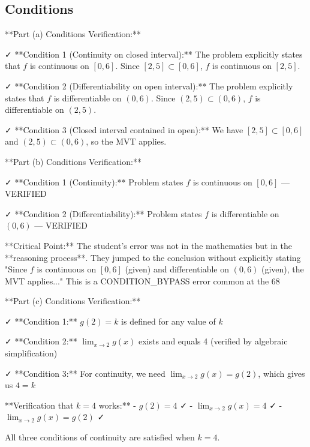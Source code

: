 \documentclass[11pt,letterpaper]{article}
\begin{document}
\subsection*{\textcolor{alphacyan}{Conditions}}
\begin{tcolorbox}[colback=alphacyan!5!white, colframe=alphacyan!50, arc=2mm]
  **Part (a) Conditions Verification:**

✓ **Condition 1 (Continuity on closed interval):** The problem explicitly states that $f$ is continuous on $[0, 6]$. Since $[2, 5] \subset [0, 6]$, $f$ is continuous on $[2, 5]$.

✓ **Condition 2 (Differentiability on open interval):** The problem explicitly states that $f$ is differentiable on $(0, 6)$. Since $(2, 5) \subset (0, 6)$, $f$ is differentiable on $(2, 5)$.

✓ **Condition 3 (Closed interval contained in open):** We have $[2, 5] \subset [0, 6]$ and $(2, 5) \subset (0, 6)$, so the MVT applies.

**Part (b) Conditions Verification:**

✓ **Condition 1 (Continuity):** Problem states $f$ is continuous on $[0, 6]$ — VERIFIED

✓ **Condition 2 (Differentiability):** Problem states $f$ is differentiable on $(0, 6)$ — VERIFIED

**Critical Point:** The student's error was not in the mathematics but in the **reasoning process**. They jumped to the conclusion without explicitly stating "Since $f$ is continuous on $[0, 6]$ (given) and differentiable on $(0, 6)$ (given), the MVT applies..." This is a CONDITION_BYPASS error common at the 68%

**Part (c) Conditions Verification:**

✓ **Condition 1:** $g(2) = k$ is defined for any value of $k$

✓ **Condition 2:** $\lim_{x \to 2} g(x)$ exists and equals 4 (verified by algebraic simplification)

✓ **Condition 3:** For continuity, we need $\lim_{x \to 2} g(x) = g(2)$, which gives us $4 = k$

**Verification that $k = 4$ works:**
- $g(2) = 4$ ✓
- $\lim_{x \to 2} g(x) = 4$ ✓
- $\lim_{x \to 2} g(x) = g(2)$ ✓

All three conditions of continuity are satisfied when $k = 4$.
\end{tcolorbox}

\vspace{0.5cm}
\end{document}
